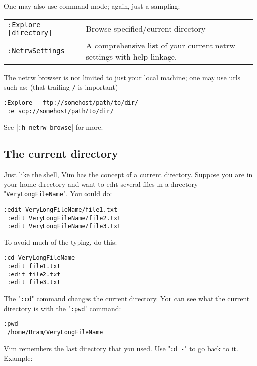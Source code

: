 One may also use command mode; again, just a sampling:

\begin{center} \begin{longtable}{l l}
				\texttt{:Explore [directory]} & Browse specified/current directory \\
				\texttt{:NetrwSettings} & A comprehensive list of your current netrw settings with help linkage.
\end{longtable} \end{center}

The netrw browser is not limited to just your local machine; one may use urls such as:
(that trailing \texttt{/} is important)

\begin{Verbatim}[samepage=true]
 :Explore   ftp://somehost/path/to/dir/
 :e scp://somehost/path/to/dir/
\end{Verbatim}

See |\texttt{:h netrw-browse}| for more.
\subsection{The current directory}

Just like the shell, Vim has the concept of a current directory.
Suppose you are in your home directory and want to edit several files in a directory "\texttt{VeryLongFileName}".
You could do:

\begin{Verbatim}[samepage=true]
 :edit VeryLongFileName/file1.txt
 :edit VeryLongFileName/file2.txt
 :edit VeryLongFileName/file3.txt
\end{Verbatim}

To avoid much of the typing, do this:

\begin{Verbatim}[samepage=true]
 :cd VeryLongFileName
 :edit file1.txt
 :edit file2.txt
 :edit file3.txt
\end{Verbatim}

The "\texttt{:cd}" command changes the current directory.
You can see what the current directory is with the "\texttt{:pwd}" command:

\begin{Verbatim}[samepage=true]
 :pwd
 /home/Bram/VeryLongFileName
\end{Verbatim}

Vim remembers the last directory that you used.
Use "\texttt{cd -}" to go back to it.
Example:

